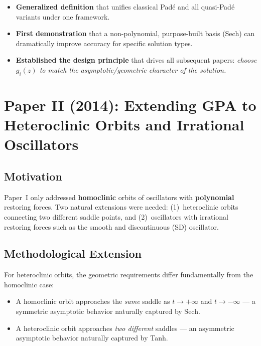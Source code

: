 \documentclass[11pt,a4paper]{article}
\begin{document}
\begin{itemize}[leftmargin=2em]
\item \textbf{Generalized definition} that unifies classical Pad\'e and all quasi-Pad\'e variants under one framework.
\item \textbf{First demonstration} that a non-polynomial, purpose-built basis (Sech) can dramatically improve accuracy for specific solution types.
\item \textbf{Established the design principle} that drives all subsequent papers: \emph{choose $g_i(z)$ to match the asymptotic/geometric character of the solution.}
\end{itemize}

\section{Paper II (2014): Extending GPA to Heteroclinic Orbits and Irrational Oscillators}

\subsection{Motivation}

Paper~I only addressed \textbf{homoclinic} orbits of oscillators with \textbf{polynomial} restoring forces. Two natural extensions were needed: (1)~heteroclinic orbits connecting two different saddle points, and (2)~oscillators with irrational restoring forces such as the smooth and discontinuous (SD) oscillator.

\subsection{Methodological Extension}

For heteroclinic orbits, the geometric requirements differ fundamentally from the homoclinic case:
\begin{itemize}[leftmargin=2em]
\item A homoclinic orbit approaches the \emph{same} saddle as $t \to +\infty$ and $t \to -\infty$ --- a symmetric asymptotic behavior naturally captured by Sech.
\item A heteroclinic orbit approaches \emph{two different} saddles --- an asymmetric asymptotic behavior naturally captured by Tanh.
\end{itemize}
\end{document}
